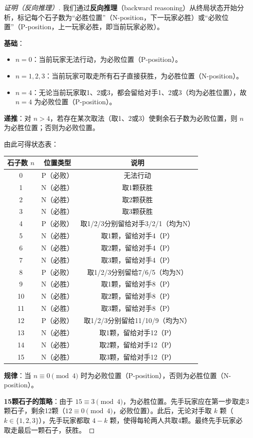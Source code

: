 \documentclass[UTF8,11pt,a4paper]{ctexbook}   %
\theoremstyle{definition}
\begin{document}
\begin{proof}[证明（反向推理）]
我们通过\textbf{反向推理}（backward reasoning）从终局状态开始分析，标记每个石子数为``必胜位置''（N-position，下一玩家必胜）或``必败位置''（P-position，上一玩家必胜，即当前玩家必败）。

\textbf{基础}：
\begin{itemize}
    \item $n=0$：当前玩家无法行动，为必败位置（P-position）。
    \item $n=1,2,3$：当前玩家可取走所有石子直接获胜，为必胜位置（N-position）。
    \item $n=4$：无论当前玩家取1、2或3，都会留给对手1、2或3（均为必胜位置），故 $n=4$ 为必败位置（P-position）。
\end{itemize}

\textbf{递推}：对 $n>4$，若存在某次取法（取1、2或3）使剩余石子数为必败位置，则 $n$ 为必胜位置；否则为必败位置。

由此可得状态表：
\begin{table}[htbp]
\centering
\begin{tabular}{|c|c|c|}
\hline
\textbf{石子数} $n$ & \textbf{位置类型} & \textbf{说明} \\
\hline
0 & P（必败） & 无法行动 \\
1 & N（必胜） & 取1颗获胜 \\
2 & N（必胜） & 取2颗获胜 \\
3 & N（必胜） & 取3颗获胜 \\
4 & P（必败） & 取1/2/3分别留给对手3/2/1（均为N） \\
5 & N（必胜） & 取1颗，留给对手4（P） \\
6 & N（必胜） & 取2颗，留给对手4（P） \\
7 & N（必胜） & 取3颗，留给对手4（P） \\
8 & P（必败） & 取1/2/3分别留给7/6/5（均为N） \\
9 & N（必胜） & 取1颗，留给对手8（P） \\
10 & N（必胜） & 取2颗，留给对手8（P） \\
11 & N（必胜） & 取3颗，留给对手8（P） \\
12 & P（必败） & 取1/2/3分别留给11/10/9（均为N） \\
13 & N（必胜） & 取1颗，留给对手12（P） \\
14 & N（必胜） & 取2颗，留给对手12（P） \\
15 & N（必胜） & 取3颗，留给对手12（P） \\
\hline
\end{tabular}
\end{table}

\textbf{规律}：当 $n \equiv 0 \pmod{4}$ 时为必败位置（P-position），否则为必胜位置（N-position）。

\textbf{15颗石子的策略}：由于 $15 \equiv 3 \pmod{4}$，为必胜位置。先手玩家应在第一步取走3颗石子，剩余12颗（$12 \equiv 0 \pmod{4}$，必败位置）。此后，无论对手取 $k$ 颗（$k \in \{1,2,3\}$），先手玩家都取 $4-k$ 颗，使得每轮两人共取4颗。最终先手玩家必取走最后一颗石子，获胜。
\end{proof}
\end{document}

